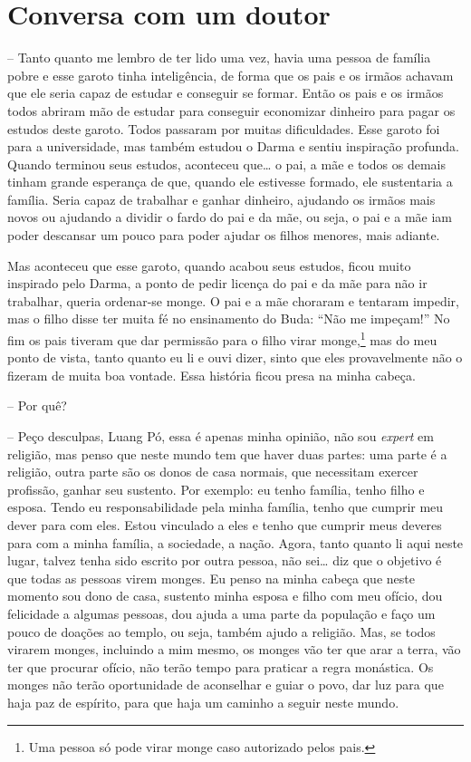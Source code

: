 
\chapter{Conversa com um doutor}
\markright{\theChapterAuthor}

 -- Tanto quanto me lembro de ter lido uma vez, havia
uma pessoa de família pobre e esse garoto tinha inteligência, de forma
que os pais e os irmãos achavam que ele seria capaz de estudar e
conseguir se formar. Então os pais e os irmãos todos abriram mão de
estudar para conseguir economizar dinheiro para pagar os estudos deste
garoto. Todos passaram por muitas dificuldades. Esse garoto foi para a
universidade, mas também estudou o Darma e sentiu inspiração profunda.
Quando terminou seus estudos, aconteceu que\ldots{} o pai, a mãe e todos os
demais tinham grande esperança de que, quando ele estivesse formado,
ele sustentaria a família. Seria capaz de trabalhar e ganhar dinheiro,
ajudando os irmãos mais novos ou ajudando a dividir o fardo do pai e da
mãe, ou seja, o pai e a mãe iam poder descansar um pouco para poder
ajudar os filhos menores, mais adiante.

Mas aconteceu que esse garoto, quando acabou seus estudos, ficou
muito inspirado pelo Darma, a ponto de pedir licença do pai e da mãe
para não ir trabalhar, queria ordenar-se monge. O pai e a mãe choraram
e tentaram impedir, mas o filho disse ter muita fé no ensinamento do
Buda: “Não me impeçam!” No fim os pais tiveram que dar permissão para o
filho virar monge,\footnote{Uma pessoa só pode virar monge caso
autorizado pelos pais.} mas do meu ponto de vista, tanto quanto eu li
e ouvi dizer, sinto que eles provavelmente não o fizeram de muita boa
vontade. Essa história ficou presa na minha cabeça. 

 -- Por quê? 

-- Peço desculpas, Luang Pó, essa é apenas minha opinião, não sou
\emph{expert} em religião, mas penso que neste mundo tem que haver
duas partes: uma parte é a religião, outra parte são os donos de casa
normais, que necessitam exercer profissão, ganhar seu sustento. Por
exemplo: eu tenho família, tenho filho e esposa. Tendo eu
responsabilidade pela minha família, tenho que cumprir meu dever para
com eles. Estou vinculado a eles e tenho que cumprir meus deveres para
com a minha família, a sociedade, a nação. Agora, tanto quanto li aqui
neste lugar, talvez tenha sido escrito por outra pessoa, não sei\ldots{} diz
que o objetivo é que todas as pessoas virem monges. Eu penso na minha
cabeça que neste momento sou dono de casa, sustento minha esposa e
filho com meu ofício, dou felicidade a algumas pessoas, dou ajuda a uma
parte da população e faço um pouco de doações ao templo, ou seja,
também ajudo a religião. Mas, se todos virarem monges, incluindo a mim
mesmo, os monges vão ter que arar a terra, vão ter que procurar ofício,
não terão tempo para praticar a regra monástica. Os monges não terão
oportunidade de aconselhar e guiar o povo, dar luz para que haja paz de
espírito, para que haja um caminho a seguir neste mundo. 


